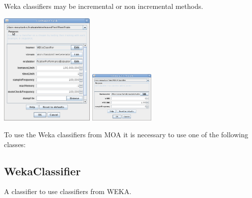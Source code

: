 \documentclass[a4paper,12pt,twoside]{book}
\begin{document}
Weka classifiers may be incremental or non incremental methods.

\begin{center}
\includegraphics[height=5.5cm]{images/Screenshot-moa2.png}
\includegraphics[height=2.5cm]{images/Screenshot-moa1.png}
\end{center}

To use the Weka classifiers from MOA it is necessary to use one of the following classes:

 \subsection{WekaClassifier} A classifier to use classifiers from WEKA.
\end{document}
